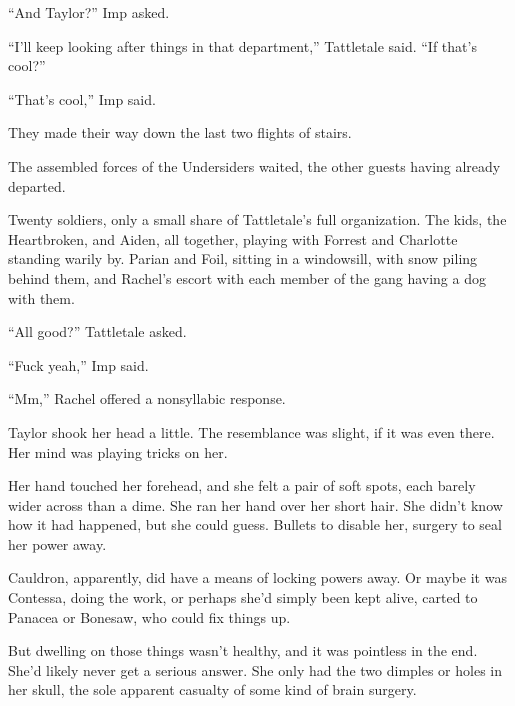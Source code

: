 ``And Taylor?''  Imp asked.



``I'll keep looking after things in that department,'' Tattletale said.  ``If that's cool?''



``That's cool,'' Imp said.



They made their way down the last two flights of stairs.



The assembled forces of the Undersiders waited, the other guests having already departed.



Twenty soldiers, only a small share of Tattletale's full organization.  The kids, the Heartbroken, and Aiden, all together, playing with Forrest and Charlotte standing warily by.  Parian and Foil, sitting in a windowsill, with snow piling behind them, and Rachel's escort with each member of the gang having a dog with them.



``All good?'' Tattletale asked.



``Fuck yeah,'' Imp said.



``Mm,'' Rachel offered a nonsyllabic response.



\sectionbreak



Taylor shook her head a little.  The resemblance was slight, if it was even there.  Her mind was playing tricks on her.



Her hand touched her forehead, and she felt a pair of soft spots, each barely wider across than a dime.  She ran her hand over her short hair.  She didn't know how it had happened, but she could guess.  Bullets to disable her, surgery to seal her power away.



Cauldron, apparently, did have a means of locking powers away.  Or maybe it was Contessa, doing the work, or perhaps she'd simply been kept alive, carted to Panacea or Bonesaw, who could fix things up.



But dwelling on those things wasn't healthy, and it was pointless in the end.  She'd likely never get a serious answer.  She only had the two dimples or holes in her skull, the sole apparent casualty of some kind of brain surgery.




